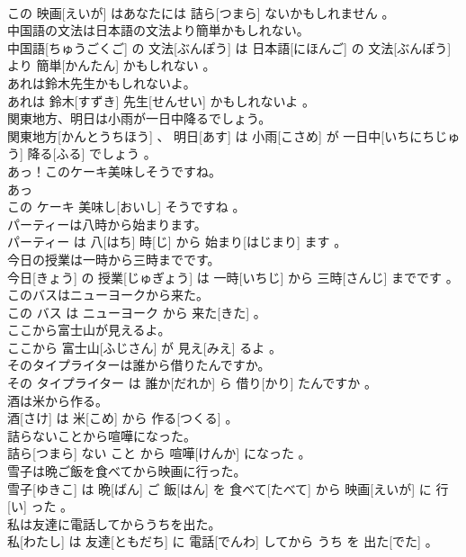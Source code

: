 \documentclass[8pt]{extreport}
\begin{document}
\begin{CJK}{UTF8}{min}
\\	この 映画[えいが] はあなたには 詰ら[つまら] ないかもしれません 。
\\	中国語の文法は日本語の文法より簡単かもしれない。	
\\	中国語[ちゅうごくご] の 文法[ぶんぽう] は 日本語[にほんご] の 文法[ぶんぽう] より 簡単[かんたん] かもしれない 。
\\	あれは鈴木先生かもしれないよ。	
\\	あれは 鈴木[すずき] 先生[せんせい] かもしれないよ 。
\\	関東地方、明日は小雨が一日中降るでしょう。	
\\	関東地方[かんとうちほう] 、 明日[あす] は 小雨[こさめ] が 一日中[いちにちじゅう] 降る[ふる] でしょう 。
\\	あっ！このケーキ美味しそうですね。	
\\	あっ 
\\	この ケーキ 美味し[おいし] そうですね 。
\\	パーティーは八時から始まります。	
\\	パーティー は 八[はち] 時[じ] から 始まり[はじまり] ます 。
\\	今日の授業は一時から三時までです。	
\\	今日[きょう] の 授業[じゅぎょう] は 一時[いちじ] から 三時[さんじ] までです 。
\\	このバスはニューヨークから来た。	
\\	この バス は ニューヨーク から 来た[きた] 。
\\	ここから富士山が見えるよ。	
\\	ここから 富士山[ふじさん] が 見え[みえ] るよ 。
\\	そのタイプライターは誰から借りたんですか。	
\\	その タイプライター は 誰か[だれか] ら 借り[かり] たんですか 。
\\	酒は米から作る。	
\\	酒[さけ] は 米[こめ] から 作る[つくる] 。
\\	詰らないことから喧嘩になった。	
\\	詰ら[つまら] ない こと から 喧嘩[けんか] になった 。
\\	雪子は晩ご飯を食べてから映画に行った。	
\\	雪子[ゆきこ] は 晩[ばん] ご 飯[はん] を 食べて[たべて] から 映画[えいが] に 行[い] った 。
\\	私は友達に電話してからうちを出た。	
\\	私[わたし] は 友達[ともだち] に 電話[でんわ] してから うち を 出た[でた] 。

\end{CJK}
\end{document}
